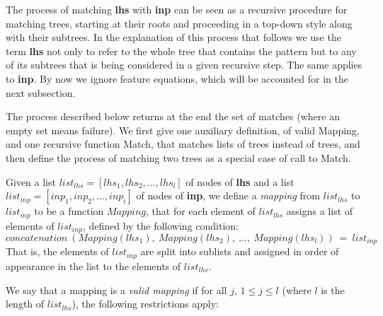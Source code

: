 The process of matching {\bf lhs} with {\bf inp} can be seen as a recursive 
procedure for matching trees, starting at their roots and proceeding in a 
top-down style along with their subtrees. 
In the explanation of this process that 
follows we use the term {\bf lhs} not only to refer to the whole tree 
that contains the pattern 
but to any of its subtrees that is being considered in a 
given recursive step. The same applies to {\bf inp}. 
By now we ignore feature equations,
which will be accounted for in the next subsection.

The process described below returns at the end the set of matches (where an
empty set means failure). We first give one auxiliary definition, of valid
Mapping, and one recursive function Match, that matches lists of trees instead
of trees, and then define the process of matching two trees as a special case
of call to Match.

Given a list $list_{lhs}=[lhs_1, lhs_2, ..., lhs_l]$ of nodes of {\bf lhs}
and a list $list_{inp}=[inp_1, inp_2, ..., inp_i]$ of nodes of {\bf inp},
we define a {\it mapping} from $list_{lhs}$ to $list_{inp}$ to be a function
$Mapping$,
that for each element of $list_{lhs}$ assigns a list of elements of 
$list_{inp}$, defined by the following condition:
$$concatenation\ (Mapping(lhs_1),\ Mapping(lhs_2),\ ...,\ Mapping(lhs_l))\ =\ 
        list_{inp}$$
That is, the elements of $list_{inp}$ are split into sublists and assigned in 
order of appearance in the list to the elements of $list_{lhs}$.

We say that a mapping is a {\it valid mapping} if for all $j$, $1\leq j \leq l$
(where $l$ is the length of $list_{lhs}$), the following restrictions apply:

